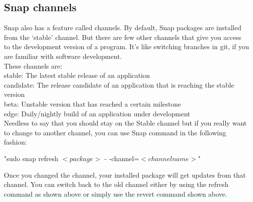 \documentclass{article}
\begin{document}
\begin{flushleft}
\subsection{Snap channels}\label{sec:channels}
Snap also has a feature called channels. By default, Snap packages are installed from the ‘stable’ channel. But there are few other channels that give you access to the development version of a program. It’s like switching branches in git, if you are familiar with software development.\\
These channels are:\\
\bigskip
stable: The latest stable release of an application\\
\bigskip
candidate: The release candidate of an application that is reaching the stable version\\
\bigskip
beta: Unstable version that has reached a certain milestone\\
\bigskip
edge: Daily/nightly build of an application under development\\
\bigskip
Needless to say that you should stay on the Stable channel but if you really want to change to another channel, you can use Snap command in the following fashion:\\
			\begin{center}				
			"sudo snap refresh $<package>$ - -channel=$<channel name>$"
			\end{center}
			
Once you changed the channel, your installed package will get updates from that channel. You can switch back to the old channel either by using the refresh command as shown above or simply use the revert command shown above.\\
\cleardoublepage
%
%
%
%
%

\end{flushleft}
\end{document}
